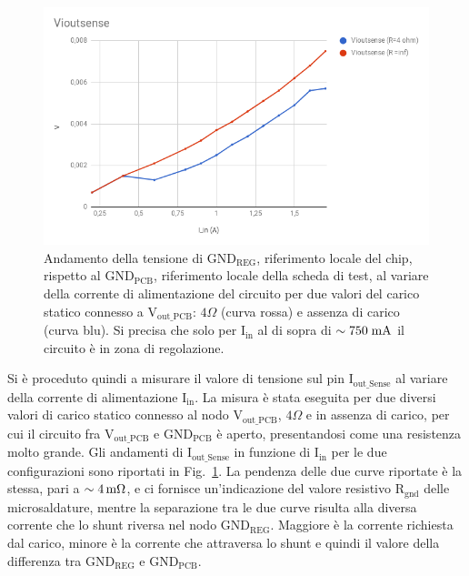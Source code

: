 \begin{figure}
\centering
\includegraphics[scale=.4]{Immagini/Viout}
\caption{Andamento della tensione di $\mathrm{GND_{REG}}$, riferimento locale del chip, rispetto al $\mathrm{GND_{PCB}}$, riferimento locale della  scheda di test, al variare della corrente di alimentazione del circuito per due valori del carico statico connesso a $\mathrm{V_{out{\_}PCB}}$:  $4\Omega$ (curva rossa) e assenza di carico (curva blu). Si precisa che solo per $\mathrm{I_{in}}$ al di sopra di $\sim 750\rm \; mA$ il circuito \`e in zona di regolazione.}
\label{VioutSense}
\end{figure}
Si è proceduto quindi a misurare il valore di tensione sul pin $\mathrm{I_{out{\_}Sense}}$ al variare della corrente di alimentazione $\mathrm{I_{in}}$. 
La misura è stata eseguita per due diversi valori di carico statico connesso al nodo $\mathrm{V_{out{\_}PCB}}$, $4\Omega$ e in assenza di carico, per cui il circuito fra $\mathrm{V_{out{\_}PCB}}$ e $\mathrm{GND_{PCB}}$ è aperto, presentandosi come una resistenza molto grande.
Gli andamenti di $\mathrm{I_{out {\_} Sense}}$ in funzione di $\mathrm{I_{in}}$ per le due configurazioni sono riportati in Fig.~\ref{VioutSense}.
La pendenza delle due curve riportate è la stessa, pari a $\sim 4{\rm \, m\Omega}$, e ci fornisce un'indicazione del valore resistivo $\mathrm{R_{gnd}}$ delle microsaldature, mentre la separazione tra le due curve risulta alla diversa corrente che lo shunt riversa nel nodo $\mathrm{GND_{REG}}$. Maggiore è la corrente richiesta dal carico, minore è la corrente che attraversa lo shunt e quindi il valore della differenza tra $\mathrm{GND_{REG}}$ e $\mathrm{GND_{PCB}}$.
